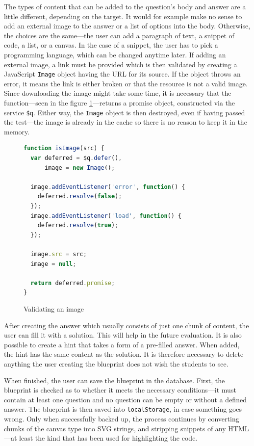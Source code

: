 \documentclass[thesis=M,english,hidelinks]{FITthesis}[2012/10/20]
\newcommand{\code}{\texttt}
\begin{document}
The types of content that can be added to the question's body and answer are a little different, depending on the target. It would for example make no sense to add an external image to the answer or a list of options into the body. Otherwise, the choices are the same---the user can add a paragraph of text, a snippet of code, a list, or a canvas. In the case of a snippet, the user has to pick a programming language, which can be changed anytime later. If adding an external image, a link must be provided which is then validated by creating a JavaScript \code{Image} object having the URL for its source. If the object throws an error, it means the link is either broken or that the resource is not a valid image. Since downloading the image might take some time, it is necessary that the function---seen in the figure \ref{fig:image_validation}---returns a promise object, constructed via the service \code{\$q}. Either way, the \code{Image} object is then destroyed, even if having passed the test---the image is already in the cache so there is no reason to keep it in the memory.

\begin{figure}[h]
  \begin{lstlisting}[language=JavaScript]
function isImage(src) {
  var deferred = $q.defer(),
      image = new Image();

  image.addEventListener('error', function() {
    deferred.resolve(false);
  });
  image.addEventListener('load', function() {
    deferred.resolve(true);
  });

  image.src = src;
  image = null;

  return deferred.promise;
}
  \end{lstlisting}
  \caption{Validating an image}
  \label{fig:image_validation}
\end{figure}

After creating the answer which usually consists of just one chunk of content, the user can fill it with a solution. This will help in the future evaluation. It is also possible to create a hint that takes a form of a pre-filled answer. When added, the hint has the same content as the solution. It is therefore necessary to delete anything the user creating the blueprint does not wish the students to see.

When finished, the user can save the blueprint in the database. First, the blueprint is checked as to whether it meets the necessary conditions---it must contain at least one question and no question can be empty or without a defined answer. The blueprint is then saved into \code{localStorage}, in case something goes wrong. Only when successfully backed up, the process continues by converting chunks of the canvas type into SVG strings, and stripping snippets of any HTML---at least the kind that has been used for highlighting the code.
\end{document}
